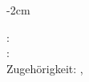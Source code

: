 \begin{titlepage}
\begin{addmargin}[-0cm]{-2cm}
\begin{center}



        \vspace{2em}

        : \mySupervisor\\
        \unless\ifbachelor
        : \myProf\\
        \fi
        Zugehörigkeit: \myFaculty, \myDepartment %



%
%
%

    \end{center}
  \end{addmargin}
\end{titlepage}
